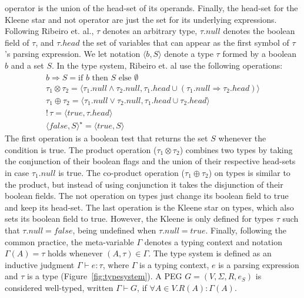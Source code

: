 \documentclass[sigplan,screen]{acmart}
\theoremstyle{definition}
\begin{document}
operator is the union of the head-set of its operands. Finally, the head-set
for the Kleene star and not operator are just the set for its underlying expressions.
Following Ribeiro et. al., $\tau$ denotes an arbitrary type, $\tau.null$
denotes the boolean field of $\tau$, and $\tau.head$ the set of
variables that can appear as the first symbol of $\tau$'s parsing expression.
We let notation $\langle b , S \rangle$ denote a type $\tau$ formed by a
boolean $b$ and a set $S$. In the type system, Ribeiro et. al use the following operations:
\[
  \begin{array}{l}
    b \Rightarrow S = \text{if } b \text{ then } S \text{ else }\emptyset\\
    \tau_1 \otimes \tau_2 = \langle \tau_1.null \land \tau_2.null,
                                \tau_1.head \cup (\tau_1.null \Rightarrow \tau_2.head) \rangle \\
    \tau_1 \oplus \tau_2 = \langle \tau_1.null \lor \tau_2.null,
                                \tau_1.head \cup \tau_2.head\rangle\\
    !\,\tau = \langle true , \tau.head \rangle\\
    \langle false, S \rangle^\star = \langle true, S \rangle
  \end{array}
\]
The first operation is a boolean test that returns the set $S$
whenever the condition is true. The product operation ($\tau_1 \otimes \tau_2$) combines two
types by taking the conjunction of their boolean flags and the union of their respective
head-sets in case $\tau_1.null$ is true. The co-product operation ($\tau_1 \oplus \tau_2$) on types is similar to the
product, but instead of using conjunction it takes the disjunction of their boolean fields.
The not operation on types just change its boolean field to true and keep its head-set.
The last operation is the Kleene star on types, which also sets its boolean field to true.
However, the Kleene is only defined for types $\tau$ such that $\tau.null = false$, being
undefined when $\tau.null = true$. Finally, following the common practice, the meta-variable
$\Gamma$ denotes a typing context and notation $\Gamma(A) = \tau$ holds whenever
$(A,\tau) \in \Gamma$.
The type system is defined as an inductive judgment
$\Gamma \vdash e : \tau$, where $\Gamma$ is a typing context, $e$ is a parsing expression
and $\tau$ is a type (Figure~\ref{fig:typesystem}). A
PEG $G = (V,\Sigma,R,e_S)$ is considered well-typed, written $\Gamma \vdash G$,
if $\forall A \in V . R(A) : \Gamma (A)$.
\end{document}
